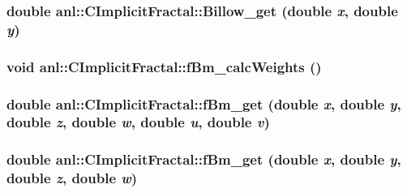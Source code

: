 \label{classanl_1_1CImplicitFractal_aab8ab114b19b3e04dae0d87905034d58}
\hypertarget{classanl_1_1CImplicitFractal_ae93e8800e17b8632d8cbb7207c35389a}{
\subsubsection[{Billow\_\-get}]{\setlength{\rightskip}{0pt plus 5cm}double anl::CImplicitFractal::Billow\_\-get (double {\em x}, \/  double {\em y})}}
\label{classanl_1_1CImplicitFractal_ae93e8800e17b8632d8cbb7207c35389a}
\hypertarget{classanl_1_1CImplicitFractal_ae2d92c0dfc87bd09be6fa7b7c7fcefd5}{
\subsubsection[{fBm\_\-calcWeights}]{\setlength{\rightskip}{0pt plus 5cm}void anl::CImplicitFractal::fBm\_\-calcWeights ()}}
\label{classanl_1_1CImplicitFractal_ae2d92c0dfc87bd09be6fa7b7c7fcefd5}
\hypertarget{classanl_1_1CImplicitFractal_ad599dde07a117b1a6b3ec867bd343356}{
\subsubsection[{fBm\_\-get}]{\setlength{\rightskip}{0pt plus 5cm}double anl::CImplicitFractal::fBm\_\-get (double {\em x}, \/  double {\em y}, \/  double {\em z}, \/  double {\em w}, \/  double {\em u}, \/  double {\em v})}}
\label{classanl_1_1CImplicitFractal_ad599dde07a117b1a6b3ec867bd343356}
\hypertarget{classanl_1_1CImplicitFractal_a3b06159c0b1cefbeeeb92d7af4884671}{
\subsubsection[{fBm\_\-get}]{\setlength{\rightskip}{0pt plus 5cm}double anl::CImplicitFractal::fBm\_\-get (double {\em x}, \/  double {\em y}, \/  double {\em z}, \/  double {\em w})}}

